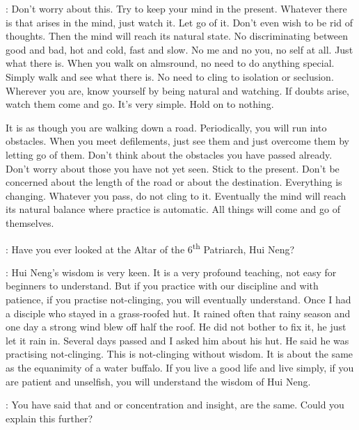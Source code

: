 : Don't worry about this. Try to keep your mind in the present. Whatever there is that arises in the mind, just watch it. Let go of it. Don't even wish to be rid of thoughts. Then the mind will reach its natural state. No discriminating between good and bad, hot and cold, fast and slow. No me and no you, no self at all. Just what there is. When you walk on almsround, no need to do anything special. Simply walk and see what there is. No need to cling to isolation or seclusion. Wherever you are, know yourself by being natural and watching. If doubts arise, watch them come and go. It's very simple. Hold on to nothing.

It is as though you are walking down a road. Periodically, you will run into obstacles. When you meet defilements, just see them and just overcome them by letting go of them. Don't think about the obstacles you have passed already. Don't worry about those you have not yet seen. Stick to the present. Don't be concerned about the length of the road or about the destination. Everything is changing. Whatever you pass, do not cling to it. Eventually the mind will reach its natural balance where practice is automatic. All things will come and go of themselves.

:
Have you ever looked at the Altar  of the 6\textsuperscript{th} Patriarch, Hui Neng?

: Hui Neng's wisdom is very keen. It is a very profound teaching, not easy for beginners to understand. But if you practice with our discipline and with patience, if you practise not-clinging, you will eventually understand. Once I had a disciple who stayed in a grass-roofed hut. It rained often that rainy season and one day a strong wind blew off half the roof. He did not bother to fix it, he just let it rain in. Several days passed and I asked him about his hut. He said he was practising not-clinging. This is not-clinging without wisdom. It is about the same as the equanimity of a water buffalo. If you live a good life and live simply, if you are patient and unselfish, you will understand the wisdom of Hui Neng.

:
You have said that  and  or concentration and insight, are the same. Could you explain this further?


